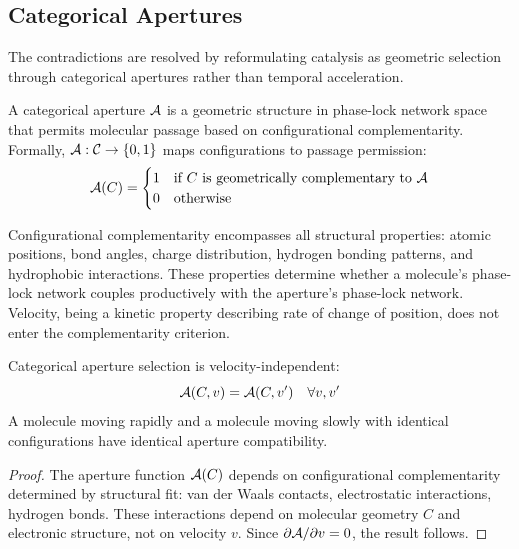 \subsection{Categorical Apertures}

The contradictions are resolved by reformulating catalysis as geometric selection through categorical apertures rather than temporal acceleration.

\begin{definition}
\label{def:aperture}
A categorical aperture $\mathcal{A}$ is a geometric structure in phase-lock network space that permits molecular passage based on configurational complementarity. Formally, $\mathcal{A}: \mathcal{C} \to \{0, 1\}$ maps configurations to passage permission:
\begin{equation}
\mathcal{A}(C) = \begin{cases}
1 & \text{if } C \text{ is geometrically complementary to } \mathcal{A} \\
0 & \text{otherwise}
\end{cases}
\end{equation}
\end{definition}

Configurational complementarity encompasses all structural properties: atomic positions, bond angles, charge distribution, hydrogen bonding patterns, and hydrophobic interactions. These properties determine whether a molecule's phase-lock network couples productively with the aperture's phase-lock network. Velocity, being a kinetic property describing rate of change of position, does not enter the complementarity criterion.

\begin{theorem}
\label{thm:aperture_velocity}
Categorical aperture selection is velocity-independent:
\begin{equation}
\mathcal{A}(C, v) = \mathcal{A}(C, v') \quad \forall v, v'
\end{equation}
A molecule moving rapidly and a molecule moving slowly with identical configurations have identical aperture compatibility.
\end{theorem}

\begin{proof}
The aperture function $\mathcal{A}(C)$ depends on configurational complementarity determined by structural fit: van der Waals contacts, electrostatic interactions, hydrogen bonds. These interactions depend on molecular geometry $C$ and electronic structure, not on velocity $v$. Since $\partial \mathcal{A}/\partial v = 0$, the result follows.
\end{proof}

